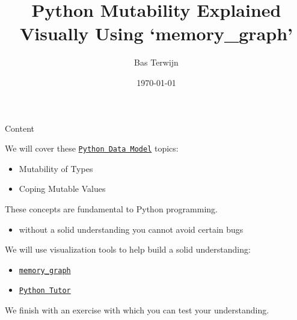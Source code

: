 \documentclass[10pt, colorlinks=true, urlcolor=blue]{beamer}
\title{Python Mutability Explained Visually Using `memory\_graph'}
\author{Bas Terwijn}
\date{\today}
\begin{document}
\begin{frame}
    \titlepage
\end{frame}

\begin{frame}{Content}

  We will cover these \href{https://docs.python.org/3/reference/datamodel.html}{\texttt{Python Data Model}} topics:
  \begin{itemize}
  \item Mutability of Types
  \item Coping Mutable Values
  \end{itemize}

  \vspace{2em}
  
  These concepts are fundamental to Python programming.
  \begin{itemize}
    \item without a solid understanding you cannot avoid certain bugs
  \end{itemize}

  \vspace{2em}
  
  We will use visualization tools to help build a solid understanding:
  \begin{itemize}
  \item \href{https://pypi.org/project/memory-graph/}{\texttt{memory\_graph}}
  \item \href{https://pythontutor.com/}{\texttt{Python Tutor}}
  \end{itemize}

  \vspace{2em}

  We finish with an exercise with which you can test your understanding.
\end{frame}
\end{document}

